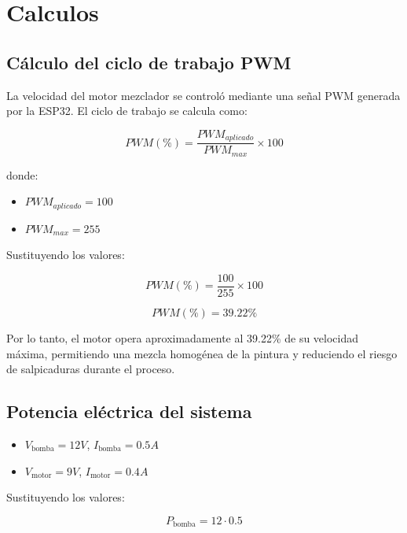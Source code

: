 \documentclass[conference]{IEEEtran}
\begin{document}
\section{Calculos}
\subsection{C\'alculo del ciclo de trabajo PWM}

La velocidad del motor mezclador se control\'o mediante una se\~nal PWM generada por la ESP32. El ciclo de trabajo se calcula como:

\begin{equation}
PWM(\%)=\frac{PWM_{aplicado}}{PWM_{max}} \times 100
\end{equation}

donde:

\begin{itemize}
    \item $PWM_{aplicado}=100$
    \item $PWM_{max}=255$
\end{itemize}

Sustituyendo los valores:

\begin{equation}
PWM(\%)=\frac{100}{255}\times100
\end{equation}

\begin{equation}
PWM(\%)=39.22\%
\end{equation}

Por lo tanto, el motor opera aproximadamente al 39.22\% de su velocidad m\'axima, permitiendo una mezcla homog\'enea de la pintura y reduciendo el riesgo de salpicaduras durante el proceso.

\subsection{Potencia el\'ectrica del sistema}

\begin{itemize}
    \item $V_{\text{bomba}} = 12V$, $I_{\text{bomba}} = 0.5A$
    \item $V_{\text{motor}} = 9V$, $I_{\text{motor}} = 0.4A$
\end{itemize}

Sustituyendo los valores:

\begin{equation}
P_{\text{bomba}} = 12 \cdot 0.5
\end{equation}
\end{document}
